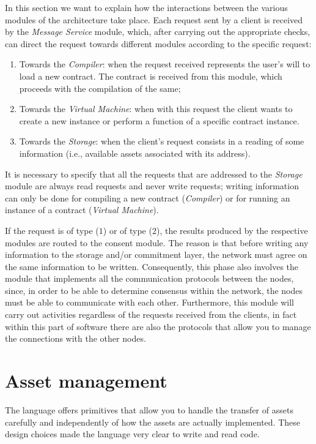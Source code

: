 In this section we want to explain how the interactions between the various modules of the architecture take 
place. Each request sent by a client is received by the \textit{Message Service} module, which, after 
carrying out the appropriate checks, can direct the request towards different modules according to the 
specific request:
\begin{enumerate}
	\item Towards the \textit{Compiler}: when the request received represents the user's will to load a new 
	contract. The contract is received from this module, which proceeds with the compilation of the same;
	\item Towards the \textit{Virtual Machine}: when with this request the client wants to create a new 
	instance or perform a function of a specific contract instance.
	\item Towards the \textit{Storage}: when the client's request consists in a reading of some information 
	(i.e., available assets associated with its address).
\end{enumerate}

It is necessary to specify that all the requests that are addressed to the \textit{Storage} module are 
always read requests and never write requests; writing information can only be done for compiling a new 
contract (\textit{Compiler}) or for running an instance of a contract (\textit{Virtual Machine}).

If the request is of type ($1$) or of type ($2$), the results produced by the respective modules are routed 
to the consent module. The reason is that before writing any information to the storage and/or commitment 
layer, the network must agree on the same information to be written. Consequently, this phase also involves 
the module that implements all the communication protocols between the nodes, since, in order to be able to 
determine consensus within the network, the nodes must be able to communicate with each other. Furthermore, 
this module will carry out activities regardless of the requests received from the clients, in fact within 
this part of software there are also the protocols that allow you to manage the connections with the other 
nodes.

\section{Asset management}

The language offers primitives that allow you to handle the transfer of assets carefully and independently 
of how the assets are actually implemented. These design choices made the language very clear to write and 
read code.

